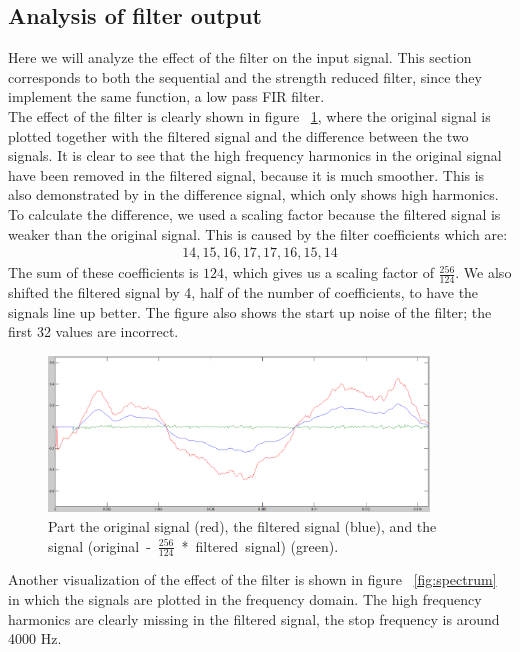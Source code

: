 \subsection{Analysis of filter output}
Here we will analyze the effect of the filter on the input signal. This section corresponds to both the sequential and the strength reduced filter, since they implement the same function, a low pass FIR filter.\\
The effect of the filter is clearly shown in figure  ~\ref{fig:diff}, where the original signal is plotted together with the filtered signal and the difference between the two signals. It is clear to see that the high frequency harmonics in the original signal have been removed in the filtered signal, because it is much smoother. This is also demonstrated by in the difference signal, which only shows high harmonics. To calculate the difference, we used a scaling factor because the filtered signal is weaker than the original signal. This is caused by the filter coefficients which are:
\begin{gather*}
14,15,16,17,17,16,15,14
\end{gather*}
The sum of these coefficients is $124$, which gives us a scaling factor of $\frac{256}{124}$. We also shifted the filtered signal by 4, half of the number of coefficients, to have the signals line up better. The figure also shows the start up noise of the filter; the first 32 values are incorrect.

\begin{figure}
\begin{center}
\includegraphics[width=0.9\textwidth]{images/diff.png}
\caption{Part the original signal (red), the filtered signal (blue), and the signal \mbox{(original - $\frac{256}{124}$ * filtered signal)} (green).}
\label{fig:diff}
\end{center}
\end{figure}

Another visualization of the effect of the filter is shown in figure  ~\ref{fig:spectrum} in which the signals are plotted in the frequency domain. The high frequency harmonics are clearly missing in the filtered signal, the stop frequency is around 4000 Hz. 

